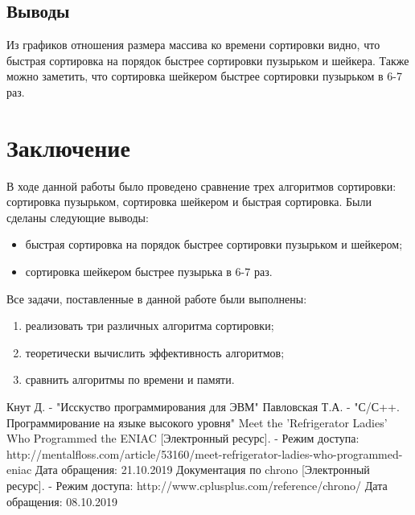 \documentclass[a4paper,12pt]{article}
\newcommand{\anonsection}[1]{\section*{#1}\addcontentsline{toc}{section}{#1}}
\begin{document}
\subsection{Выводы}

Из графиков отношения размера массива ко времени сортировки видно, что быстрая сортировка
на порядок быстрее сортировки пузырьком и шейкера. Также можно заметить, что сортировка
шейкером быстрее сортировки пузырьком в 6-7 раз.

\newpage
\anonsection{Заключение}

В ходе данной работы было проведено сравнение трех алгоритмов сортировки: сортировка
пузырьком, сортировка шейкером и быстрая сортировка. Были сделаны следующие выводы:

\begin{itemize}
    \item быстрая сортировка на порядок быстрее сортировки пузырьком и шейкером;
    \item сортировка шейкером быстрее пузырька в 6-7 раз.
\end{itemize}

Все задачи, поставленные в данной работе были выполнены:

\begin{enumerate}
    \item реализовать три различных алгоритма сортировки;
    \item теоретически вычислить эффективность алгоритмов;
    \item сравнить алгоритмы по времени и памяти.
\end{enumerate}

\newpage
{}

\begin{thebibliography}{}
     Кнут Д. - "Исскуство программирования для ЭВМ"
     Павловская Т.А. - "С/С++. Программирование на языке высокого уровня"
     Meet the 'Refrigerator Ladies' Who Programmed the ENIAC [Электронный ресурс]. - Режим доступа: http://mentalfloss.com/article/53160/meet-refrigerator-ladies-who-programmed-eniac Дата обращения: 21.10.2019
     Документация по chrono [Электронный ресурс]. -  Режим доступа: http://www.cplusplus.com/reference/chrono/ Дата обращения: 08.10.2019
\end{thebibliography}
\end{document}
